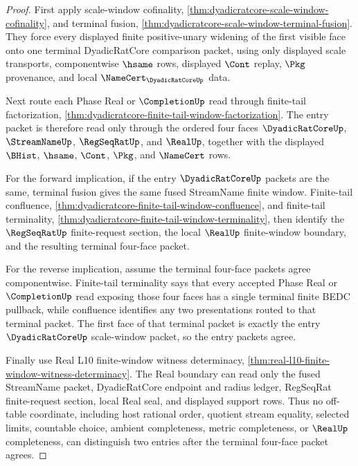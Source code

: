\begin{proof}
First apply scale-window cofinality, \autoref{thm:dyadicratcore-scale-window-cofinality}, and terminal fusion, \autoref{thm:dyadicratcore-scale-window-terminal-fusion}. They force every displayed finite positive-unary widening of the first visible face onto one terminal DyadicRatCore comparison packet, using only displayed scale transports, componentwise $\hsame$ rows, displayed $\Cont$ replay, $\Pkg$ provenance, and local $\NameCert_{\DyadicRatCoreUp}$ data.

Next route each Phase Real or $\CompletionUp$ read through finite-tail factorization, \autoref{thm:dyadicratcore-finite-tail-window-factorization}. The entry packet is therefore read only through the ordered four faces $\DyadicRatCoreUp$, $\StreamNameUp$, $\RegSeqRatUp$, and $\RealUp$, together with the displayed $\BHist$, $\hsame$, $\Cont$, $\Pkg$, and $\NameCert$ rows.

For the forward implication, if the entry $\DyadicRatCoreUp$ packets are the same, terminal fusion gives the same fused StreamName finite window. Finite-tail confluence, \autoref{thm:dyadicratcore-finite-tail-window-confluence}, and finite-tail terminality, \autoref{thm:dyadicratcore-finite-tail-window-terminality}, then identify the $\RegSeqRatUp$ finite-request section, the local $\RealUp$ finite-window boundary, and the resulting terminal four-face packet.

For the reverse implication, assume the terminal four-face packets agree componentwise. Finite-tail terminality says that every accepted Phase Real or $\CompletionUp$ read exposing those four faces has a single terminal finite BEDC pullback, while confluence identifies any two presentations routed to that terminal packet. The first face of that terminal packet is exactly the entry $\DyadicRatCoreUp$ scale-window packet, so the entry packets agree.

Finally use Real L10 finite-window witness determinacy, \autoref{thm:real-l10-finite-window-witness-determinacy}. The Real boundary can read only the fused StreamName packet, DyadicRatCore endpoint and radius ledger, RegSeqRat finite-request section, local Real seal, and displayed support rows. Thus no off-table coordinate, including host rational order, quotient stream equality, selected limits, countable choice, ambient completeness, metric completeness, or $\RealUp$ completeness, can distinguish two entries after the terminal four-face packet agrees.
\end{proof}


